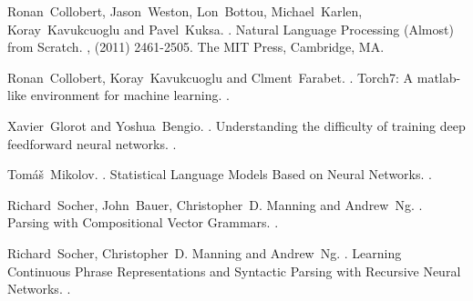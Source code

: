 \documentclass[11pt]{article}
\begin{document}
\begin{thebibliography}{}

Ronan~Collobert, Jason~Weston, Lon~Bottou, Michael~Karlen, Koray~Kavukcuoglu and Pavel~Kuksa.
.
\newblock Natural Language Processing (Almost) from Scratch.
,  (2011) 2461-2505.
\newblock The MIT Press, Cambridge, MA.

Ronan~Collobert, Koray~Kavukcuoglu and Clment~Farabet.
.
\newblock Torch7: A matlab-like environment for machine learning.
.

Xavier~Glorot and Yoshua~Bengio.
.
\newblock Understanding the difficulty of training deep feedforward neural networks.
.

Tomáš~Mikolov.
.
\newblock Statistical Language Models Based on Neural Networks.
.

Richard~Socher, John~Bauer, Christopher~D. Manning and Andrew~Ng.
.
\newblock Parsing with Compositional Vector Grammars.
.

Richard~Socher, Christopher~D. Manning and Andrew~Ng.
.
\newblock Learning Continuous Phrase Representations and
Syntactic Parsing with Recursive Neural Networks.
.

\end{thebibliography}
\end{document}
